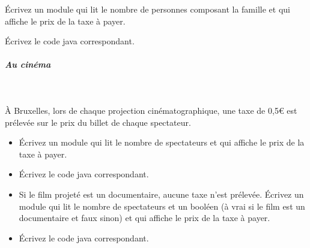 \documentclass[11pt,a4paper]{article}
\begin{document}
          \'Ecrivez un module qui lit le nombre de personnes composant la famille et qui affiche le prix de la taxe \`a payer.
        
            \par
        \'Ecrivez le code java correspondant.
            \par
        
			
		\subparagraph{Au cin\'ema} 
		
					\textcolor{white}{.} \par
				
          \`A Bruxelles, lors de chaque projection cin\'ematographique, une taxe de 0,5€ est
          pr\'elev\'ee sur le prix du billet de chaque spectateur.
          
					\begin{itemize}
				
			\item \'Ecrivez un module qui lit le nombre de spectateurs et qui affiche le prix de la taxe \`a payer.
			\item \'Ecrivez le code java correspondant.
			\item 
              Si le film projet\'e est un documentaire, aucune taxe n'est pr\'elev\'ee. 
              \'Ecrivez un module qui lit le nombre de spectateurs et un bool\'een (\`a vrai
              si le film est un documentaire et faux sinon) et qui affiche le prix de la taxe
              \`a payer.
            
			\item \'Ecrivez le code java correspondant.
					\end{itemize}
				
            \par
        
				
\end{document}
